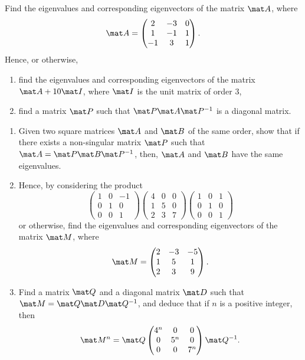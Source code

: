 \begin{problem}
    Find the eigenvalues and corresponding eigenvectors of the matrix $\mat A$, where \[\mat A = \begin{pmatrix}2 & -3 & 0 \\ 1 & - 1 & 1 \\ - 1 & 3 & 1\end{pmatrix}.\] Hence, or otherwise,
    \begin{enumerate}
        \item find the eigenvalues and corresponding eigenvectors of the matrix $\mat A + 10 \mat I$, where $\mat I$ is the unit matrix of order 3,
        \item find a matrix $\mat P$ such that $\mat P \mat A \mat P^{-1}$ is a diagonal matrix.
    \end{enumerate}
\end{problem}

\begin{problem}
    \begin{enumerate}
        \item Given two square matrices $\mat A$ and $\mat B$ of the same order, show that if there exists a non-singular matrix $\mat P$ such that $\mat A = \mat P \mat B \mat P^{-1}$, then, $\mat A$ and $\mat B$ have the same eigenvalues.
        \item Hence, by considering the product \[\begin{pmatrix}1 & 0 & -1 \\ 0 & 1 & 0 \\ 0 & 0 & 1\end{pmatrix} \begin{pmatrix}4 & 0 & 0 \\ 1 & 5 & 0 \\ 2 & 3 & 7\end{pmatrix} \begin{pmatrix}1 & 0 & 1 \\ 0 & 1 & 0 \\ 0 & 0 & 1\end{pmatrix}\] or otherwise, find the eigenvalues and corresponding eigenvectors of the matrix $\mat M$, where \[\mat M = \begin{pmatrix}2 & -3 & -5 \\ 1 & 5 & 1 \\ 2 & 3 & 9\end{pmatrix}.\]
        \item Find a matrix $\mat Q$ and a diagonal matrix $\mat D$ such that $\mat M = \mat Q \mat D \mat Q^{-1}$, and deduce that if $n$ is a positive integer, then \[\mat M^n = \mat Q \begin{pmatrix}4^n & 0 & 0 \\ 0 & 5^n & 0 \\ 0 & 0 & 7^n\end{pmatrix} \mat Q^{-1}.\]
    \end{enumerate}
\end{problem}

